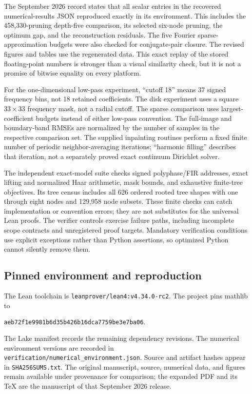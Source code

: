 \documentclass[11pt,letterpaper]{article}
\theoremstyle{plain}
\theoremstyle{plain}
\theoremstyle{plain}
\theoremstyle{definition}
\theoremstyle{definition}
\theoremstyle{definition}
\theoremstyle{definition}
\theoremstyle{remark}
\theoremstyle{remark}
\theoremstyle{remark}
\theoremstyle{remark}
\begin{document}
The September 2026 record states that all scalar entries in the recovered numerical-results JSON reproduced exactly in its environment. This includes the 458,330-pruning depth-five comparison, its selected six-node pruning, the optimum gap, and the reconstruction residuals. The five Fourier sparse-approximation budgets were also checked for conjugate-pair closure. The revised figures and tables use the regenerated data. This exact replay of the stored floating-point numbers is stronger than a visual similarity check, but it is not a promise of bitwise equality on every platform.

For the one-dimensional low-pass experiment, ``cutoff 18'' means 37 signed frequency bins, not 18 retained coefficients. The disk experiment uses a square $33\times33$ frequency mask, not a radial cutoff. The sparse comparison uses largest-coefficient budgets instead of either low-pass convention. The full-image and boundary-band RMSEs are normalized by the number of samples in the respective comparison set. The supplied inpainting routines perform a fixed finite number of periodic neighbor-averaging iterations; ``harmonic filling'' describes that iteration, not a separately proved exact continuum Dirichlet solver.

The independent exact-model suite checks signed polyphase/FIR addresses, exact lifting and normalized Haar arithmetic, mask bounds, and exhaustive finite-tree objectives. Its tree census includes all 626 ordered rooted tree shapes with one through eight nodes and 129,958 node subsets. These finite checks can catch implementation or convention errors; they are not substitutes for the universal Lean proofs. The verifier controls exercise failure paths, including incomplete scope contracts and unregistered proof targets. Mandatory verification conditions use explicit exceptions rather than Python assertions, so optimized Python cannot silently remove them.

\subsection{Pinned environment and reproduction}

The Lean toolchain is \texttt{leanprover/lean4:v4.34.0-rc2}. The project pins mathlib to
\begin{center}\small\texttt{aeb72f1e9981b6d35b426b16dca7759be3e7ba06}.\end{center}
The Lake manifest records the remaining dependency revisions. The numerical environment versions are recorded in \texttt{verification/numerical\_environment.json}. Source and artifact hashes appear in \texttt{SHA256SUMS.txt}. The original manuscript, source, numerical data, and figures remain available under provenance for comparison; the expanded PDF and its TeX are the manuscript of that September 2026 release.
\end{document}
